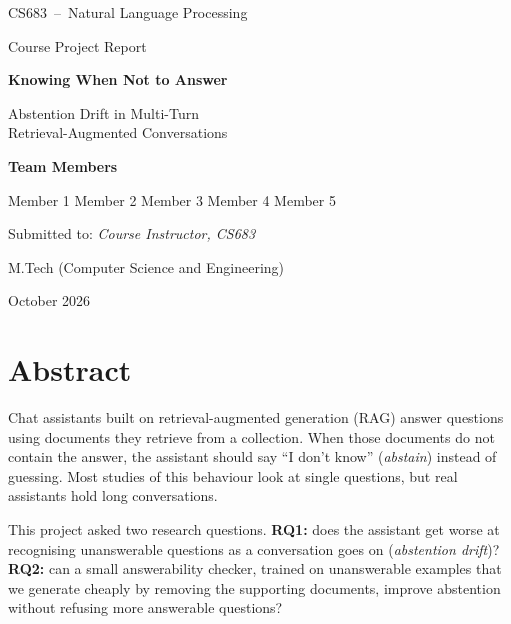 \documentclass[11pt,a4paper]{report}
\begin{document}
\begin{titlepage}
\centering
\vspace*{1.2cm}
{\large CS683 \,--\, Natural Language Processing\par}
\vspace{0.4cm}
{\large Course Project Report\par}
\vspace{2cm}
{\huge\bfseries Knowing When Not to Answer\par}
\vspace{0.4cm}
{\Large Abstention Drift in Multi-Turn\\Retrieval-Augmented Conversations\par}
\vspace{2.2cm}
{\large\bfseries Team Members\par}
\vspace{0.3cm}
{\large Member 1 \quad Member 2 \quad Member 3 \quad Member 4 \quad Member 5\par}
\vspace{2cm}
{\large Submitted to: \textit{Course Instructor, CS683}\par}
\vspace{0.3cm}
{\large M.Tech (Computer Science and Engineering)\par}
\vfill
{\large October 2026\par}
\end{titlepage}

\chapter*{Abstract}
Chat assistants built on retrieval-augmented generation (RAG) answer questions using documents they retrieve from a collection. When those documents do not contain the answer, the assistant should say ``I don't know'' (\emph{abstain}) instead of guessing. Most studies of this behaviour look at single questions, but real assistants hold long conversations.

This project asked two research questions. \textbf{RQ1:} does the assistant get worse at recognising unanswerable questions as a conversation goes on (\emph{abstention drift})? \textbf{RQ2:} can a small answerability checker, trained on unanswerable examples that we generate cheaply by removing the supporting documents, improve abstention without refusing more answerable questions?
\end{document}
